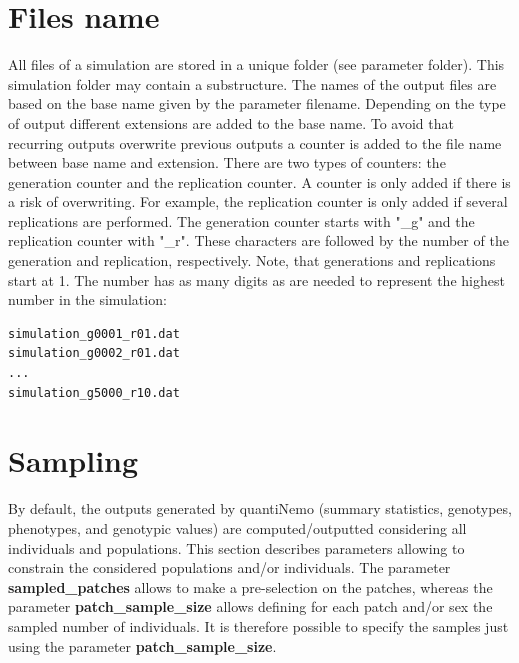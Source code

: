 \documentclass[letterpaper,12pt,oneside]{book}
\begin{document}
\section{Files name}
All files of a simulation are stored in a unique folder (see parameter \textsf{folder}). This simulation folder may contain a substructure. The names of the output files are based on the base name given by the parameter \textsf{filename}. Depending on the type of output different extensions are added to the base name. To avoid that recurring outputs overwrite previous outputs a counter is added to the file name between base name and extension. There are two types of counters: the generation counter and the replication counter. A counter is only added if there is a risk of overwriting. For example, the replication counter is only added if several replications are performed. The generation counter starts with "\_g" and the replication counter with "\_r". These characters are followed by the number of the generation and replication, respectively. Note, that generations and replications start at 1. The number has as many digits as are needed to represent the highest number in the simulation: 

\begin{lstlisting}[frame=single]
simulation_g0001_r01.dat
simulation_g0002_r01.dat
...
simulation_g5000_r10.dat
\end{lstlisting}
\section{Sampling}\label{sec:Sampling}
By default, the outputs generated by quantiNemo (summary statistics, genotypes, phenotypes, and genotypic values) are computed/outputted considering all individuals and populations. This section describes parameters allowing to constrain the considered populations and/or individuals. The parameter \textbf{sampled\_patches} allows to make a pre-selection on the patches, whereas the parameter \textbf{patch\_sample\_size} allows defining for each patch and/or sex the sampled number of individuals. It is therefore possible to specify the samples just using the parameter \textbf{patch\_sample\_size}.
 
\end{document}
